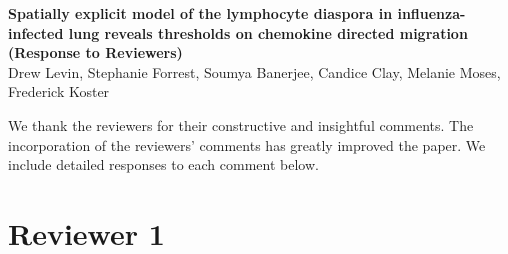 \documentclass[10pt]{article}
\date{}
\begin{document}
\begin{flushleft}
{\Large
\textbf{Spatially explicit model of the lymphocyte diaspora in influenza-infected lung reveals thresholds on chemokine directed migration (Response to Reviewers)}
}
\\
Drew Levin, 
Stephanie Forrest, 
Soumya Banerjee,
Candice Clay,
Melanie Moses, 
Frederick Koster
\end{flushleft}
\vspace{1cm}



We thank the reviewers for their constructive and insightful comments.  The incorporation of the reviewers' comments has greatly improved the paper.  We include detailed responses to each comment below.

\section*{Reviewer 1}
\end{document}
